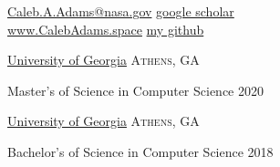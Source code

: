 \documentclass[10pt,a4paper]{article}
\begin{document}
\sloppy  %



\nobreakvspace{0.6em}  %

\noindent
\href{mailto:CalebAshmoreAdams@gmail.com}{Caleb.A.Adams\mbox{}@\mbox{}nasa.gov}
\hspace*{0pt}\hfill \href{https://scholar.google.com/citations?hl=en&user=Yuh1UscAAAAJ}{google scholar {\color{bluegreen} \faGoogle}}
\\
\href{http://calebadams.space}{www.CalebAdams.space}
\hspace*{0pt}\hfill \href{https://github.com/piepieninja}{my github {\color{bluegreen} \faGithub}}
\\

\spacedhrule{0.5em}{-0.4em}
\spacedhrule{0.5em}{-0.4em}


\headedsection
  {\href{http://uga.edu}{University of Georgia}}
  {\textsc{Athens, GA}} {%
  \headedsubsection
    {Master's of Science in Computer Science}
    {2020}
    {\bodytext{}}

  }
\headedsection
  {\href{http://uga.edu}{University of Georgia}}
  {\textsc{Athens, GA}} {%
  \headedsubsection
    {Bachelor's of Science in Computer Science}
    {2018}
    {\bodytext{}}

  }



\spacedhrule{0em}{-0.4em}
\end{document}
